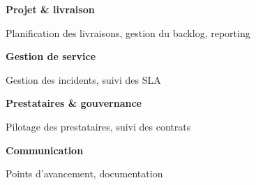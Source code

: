 
\begin{minipage}[t]{0.47\textwidth}
  \raggedright
  \textbf{Projet \& livraison}

  Planification des livraisons, gestion du backlog, reporting
\end{minipage}
\hfill
\begin{minipage}[t]{0.47\textwidth}
  \raggedright
  \textbf{Gestion de service}

  Gestion des incidents, suivi des SLA
\end{minipage}

\vspace{4mm}

\begin{minipage}[t]{0.47\textwidth}
  \raggedright
  \textbf{Prestataires \& gouvernance}

  Pilotage des prestataires, suivi des contrats
\end{minipage}
\hfill
\begin{minipage}[t]{0.47\textwidth}
  \raggedright
  \textbf{Communication}

  Points d'avancement, documentation
\end{minipage}
